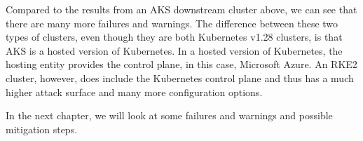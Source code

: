 Compared to the results from an AKS downstream cluster above, we can see that there are many more failures and warnings. The difference between these two types of clusters, even though they are both Kubernetes v1.28 clusters, is that AKS is a hosted version of Kubernetes. In a hosted version of Kubernetes, the hosting entity provides the control plane, in this case, Microsoft Azure. An RKE2 cluster, however, does include the Kubernetes control plane and thus has a much higher attack surface and many more configuration options.

In the next chapter, we will look at some failures and warnings and possible mitigation steps.

